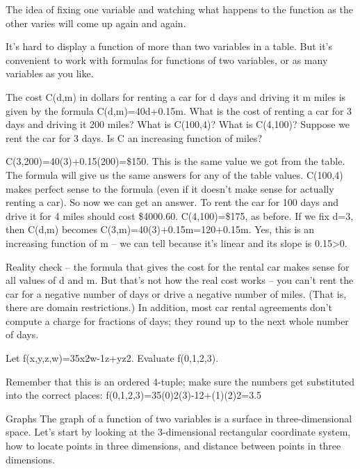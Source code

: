 The idea of fixing one variable and watching what happens to the function as the other varies will come up again and again.

It's hard to display a function of more than two variables in a table. But it's convenient to work with formulas for functions of two variables, or as many variables as you like.

\begin{example}
The cost C(d,m) in dollars for renting a car for d days and driving it m miles is given by the formula
C(d,m)=40d+0.15m.
What is the cost of renting a car for 3 days and driving it 200 miles?
What is C(100,4)? What is C(4,100)?
Suppose we rent the car for 3 days. Is C an increasing function of miles?

\begin{solution} C(3,200)=40(3)+0.15(200)=\$150. This is the same value we got from the table. The formula will give us the same answers for any of the table values.
C(100,4) makes perfect sense to the formula (even if it doesn't make sense for actually renting a car). So now we can get an answer. To rent the car for 100 days and drive it for 4 miles should cost \$4000.60. C(4,100)=\$175, as before.
If we fix d=3, then C(d,m) becomes C(3,m)=40(3)+0.15m=120+0.15m. Yes, this is an increasing function of m – we can tell because it's linear and its slope is 0.15>0.
\end{solution}\end{example}

Reality check – the formula that gives the cost for the rental car makes sense for all values of d and m. But that's not how the real cost works – you can't rent the car for a negative number of days or drive a negative number of miles. (That is, there are domain restrictions.) In addition, most car rental agreements don't compute a charge for fractions of days; they round up to the next whole number of days.

\begin{example}
Let f(x,y,z,w)=35x2w-1z+yz2. Evaluate f(0,1,2,3).

\begin{solution} Remember that this is an ordered 4-tuple; make sure the numbers get substituted into the correct places:
f(0,1,2,3)=35(0)2(3)-12+(1)(2)2=3.5
\end{solution}\end{example}

Graphs
The graph of a function of two variables is a surface in three-dimensional space. Let's start by looking at the 3-dimensional rectangular coordinate system, how to locate points in three dimensions, and distance between points in three dimensions.

